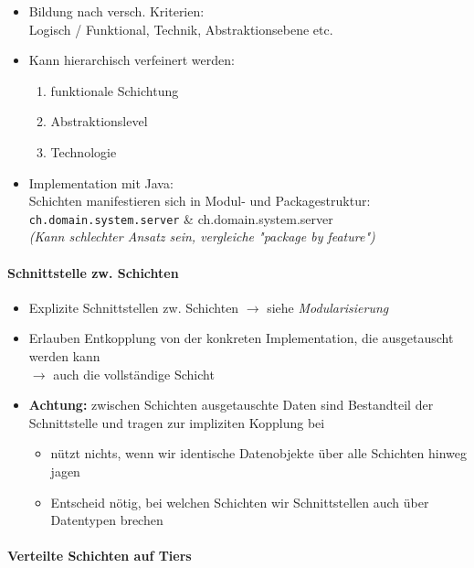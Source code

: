 \documentclass[a4paper]{article}
\begin{document}
			\begin{itemize}
				\item Bildung nach versch. Kriterien:\\
				Logisch / Funktional, Technik, Abstraktionsebene etc.
				\item Kann hierarchisch verfeinert werden:
					\begin{enumerate}
						\item funktionale Schichtung
						\item Abstraktionslevel
						\item Technologie
					\end{enumerate}
				\item Implementation mit Java:\\
				Schichten manifestieren sich in Modul- und Packagestruktur:\\
				\texttt{ch.domain.system.server} \& ch.domain.system.server\\
				\textit{(Kann schlechter Ansatz sein, vergleiche "package by feature")}
			\end{itemize}
	
				\paragraph{Schnittstelle zw. Schichten}
				
					\begin{itemize}
						\item Explizite Schnittstellen zw. Schichten $\rightarrow$ siehe \textit{Modularisierung}
						\item Erlauben Entkopplung von der konkreten Implementation, die ausgetauscht werden kann \\
						$\rightarrow$ auch die vollständige Schicht
						\item \textbf{Achtung:} zwischen Schichten ausgetauschte Daten sind Bestandteil der Schnittstelle und tragen zur impliziten Kopplung bei
							\begin{itemize}
								\item nützt nichts, wenn wir identische Datenobjekte über alle Schichten hinweg jagen
								\item Entscheid nötig, bei welchen Schichten wir Schnittstellen auch über Datentypen brechen
							\end{itemize}
					\end{itemize}
			
				\paragraph{Verteilte Schichten auf Tiers}
				
\end{document}
